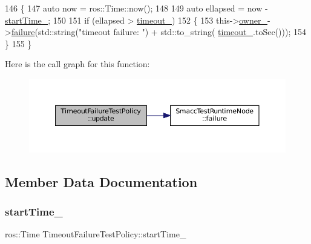 \begin{DoxyCode}
146   \{
147     \textcolor{keyword}{auto} now = ros::Time::now();
148 
149     \textcolor{keyword}{auto} ellapsed = now - \hyperlink{classTimeoutFailureTestPolicy_a75bf7a1990099ecd02017c06f3694e64}{startTime\_};
150 
151     \textcolor{keywordflow}{if} (ellapsed > \hyperlink{classTimeoutFailureTestPolicy_a6075c28b35a0e10632a2f461d7f7b63a}{timeout\_})
152     \{
153       this->\hyperlink{classTestPolicy_a717c3e59e35216a175398b85575aec43}{owner\_}->\hyperlink{classSmaccTestRuntimeNode_a58254eca6e6a5f2bde6417a1cccc932a}{failure}(std::string(\textcolor{stringliteral}{"timeout failure: "}) + std::to\_string(
      \hyperlink{classTimeoutFailureTestPolicy_a6075c28b35a0e10632a2f461d7f7b63a}{timeout\_}.toSec()));
154     \}
155   \}
\end{DoxyCode}
Here is the call graph for this function\+:
\nopagebreak
\begin{figure}[H]
\begin{center}
\leavevmode
\includegraphics[width=350pt]{classTimeoutFailureTestPolicy_a51946c46616697b0b0d9d7c7aaef9f22_cgraph}
\end{center}
\end{figure}


\subsection{Member Data Documentation}
\mbox{\label{classTimeoutFailureTestPolicy_a75bf7a1990099ecd02017c06f3694e64}} 
\subsubsection{\texorpdfstring{start\+Time\+\_\+}{startTime\_}}
{\footnotesize\ttfamily ros\+::\+Time Timeout\+Failure\+Test\+Policy\+::start\+Time\+\_\+\hspace{0.3cm}{\ttfamily [private]}}




